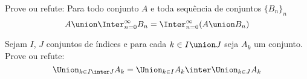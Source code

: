 \begin{exercise}
    Prove ou refute: Para todo conjunto $A$ e toda sequência de conjuntos
    $\{B_n\}_n$
    $$ 
    A \union \Inter_{n = 0}^\infty B_n =
    \Inter_{n = 0}^\infty (A \union B_n)
    $$
\end{exercise}

\begin{exercise}
    Sejam $I$, $J$ conjuntos de índices e para cada $k \in I \union J$ seja
    $A_k$ um conjunto. Prove ou refute:
    $$
    \Union_{k \in I \inter J} A_k =
    \Union_{k \in I} A_k \inter \Union_{k \in J} A_k
    $$
\end{exercise}
